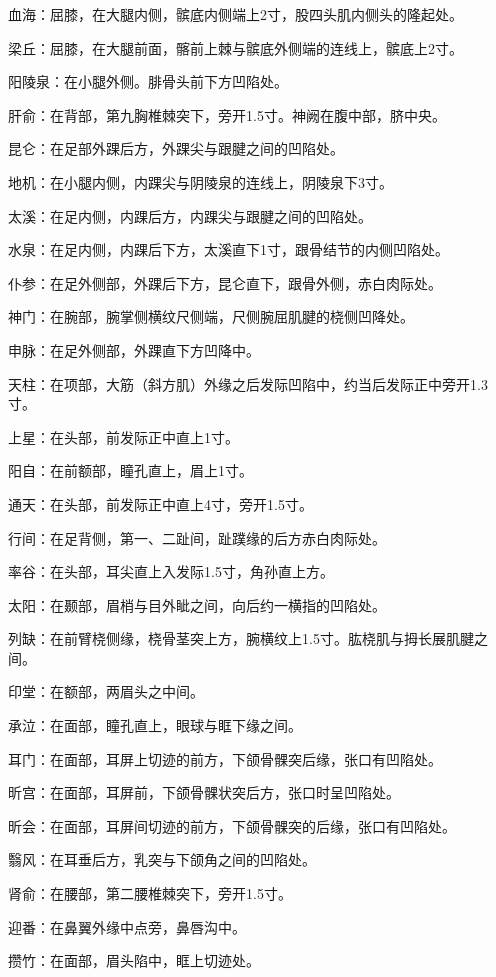 \documentclass[12pt,UTF8]{ctexbook}
\begin{document}
血海：屈膝，在大腿内侧，髌底内侧端上2寸，股四头肌内侧头的隆起处。

梁丘：屈膝，在大腿前面，髂前上棘与髌底外侧端的连线上，髌底上2寸。

阳陵泉：在小腿外侧。腓骨头前下方凹陷处。

肝俞：在背部，第九胸椎棘突下，旁开1.5寸。神阙在腹中部，脐中央。

昆仑：在足部外踝后方，外踝尖与跟腱之间的凹陷处。

地机：在小腿内侧，内踝尖与阴陵泉的连线上，阴陵泉下3寸。

太溪：在足内侧，内踝后方，内踝尖与跟腱之间的凹陷处。

水泉：在足内侧，内踝后下方，太溪直下1寸，跟骨结节的内侧凹陷处。

仆参：在足外侧部，外踝后下方，昆仑直下，跟骨外侧，赤白肉际处。

神门：在腕部，腕掌侧横纹尺侧端，尺侧腕屈肌腱的桡侧凹降处。

申脉：在足外侧部，外踝直下方凹降中。

天柱：在项部，大筋（斜方肌）外缘之后发际凹陷中，约当后发际正中旁开1.3寸。

上星：在头部，前发际正中直上1寸。

阳自：在前额部，瞳孔直上，眉上1寸。

通天：在头部，前发际正中直上4寸，旁开1.5寸。

行间：在足背侧，第一、二趾间，趾蹼缘的后方赤白肉际处。

率谷：在头部，耳尖直上入发际1.5寸，角孙直上方。

太阳：在颞部，眉梢与目外眦之间，向后约一横指的凹陷处。

列缺：在前臂桡侧缘，桡骨茎突上方，腕横纹上1.5寸。肱桡肌与拇长展肌腱之间。

印堂：在额部，两眉头之中间。

承泣：在面部，瞳孔直上，眼球与眶下缘之间。

耳门：在面部，耳屏上切迹的前方，下颌骨髁突后缘，张口有凹陷处。

昕宫：在面部，耳屏前，下颌骨髁状突后方，张口时呈凹陷处。

昕会：在面部，耳屏间切迹的前方，下颌骨髁突的后缘，张口有凹陷处。

翳风：在耳垂后方，乳突与下颌角之间的凹陷处。

肾俞：在腰部，第二腰椎棘突下，旁开1.5寸。

迎番：在鼻翼外缘中点旁，鼻唇沟中。

攒竹：在面部，眉头陷中，眶上切迹处。
\end{document}
